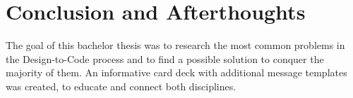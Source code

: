 \newpage
\section{Conclusion and Afterthoughts}
The goal of this bachelor thesis was to research the most common problems in the Design-to-Code
process and to find a possible solution to conquer the majority of them. An informative card deck
with additional message templates was created, to educate and connect both disciplines.






